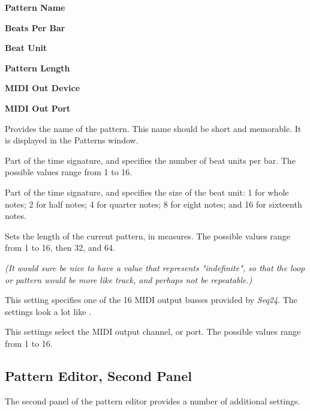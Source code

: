    \begin{enumber}
      \item \textbf{Pattern Name}
      \item \textbf{Beats Per Bar}
      \item \textbf{Beat Unit}
      \item \textbf{Pattern Length}
      \item \textbf{MIDI Out Device}
      \item \textbf{MIDI Out Port}
   \end{enumber}

   \setcounter{ItemCounter}{0}      %

   Provides the name of the pattern.
   This name should be short and memorable.
   It is displayed in the Patterns window.

   Part of the time signature, and specifies the number of beat units per bar.
   The possible values range from 1 to 16.

   Part of the time signature, and specifies the size of the beat unit:
   1 for whole notes; 2 for half notes; 4 for quarter notes; 8 for eight notes;
   and 16 for sixteenth notes.

   Sets the length of the current pattern, in measures.
   The possible values range from 1 to 16, then 32, and 64.

   \textsl{(It would sure be nice to have a value that represents
   "indefinite", so that the loop or pattern would be more like track,
   and perhaps not be repeatable.)}

   This setting specifies one of the 16 MIDI output busses provided by
   \textsl{Seq24}.  The settings look a lot like
   .

   This settings select the MIDI output channel, or port.
   The possible values range from 1 to 16.

\subsection{Pattern Editor, Second Panel}
\label{subsec:seq24_pattern_editor_second}

   The second panel of the pattern editor provides a number of additional
   settings.

